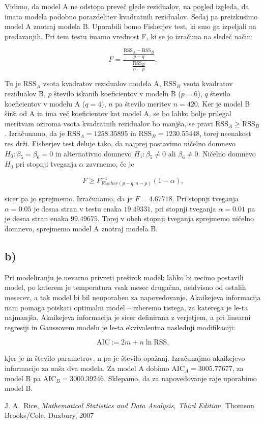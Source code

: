 \documentclass[12pt, a4paper]{article}
\begin{document}
Vidimo, da model A ne odstopa preveč glede rezidualov, na pogled izgleda, da imata 
modela podobno porazdelitev kvadratnih rezidualov. 
Sedaj pa preizkusimo model A znotraj modela B. Uporabili bomo Fisherjev test, ki 
smo ga izpeljali na predavanjih. Pri tem testu imamo vrednost F, ki se jo izračuna 
na sledeč način: 

$$  F = \frac{\frac{\text{RSS}_A - \text{RSS}_B}{p-q}}{\frac{\text{RSS}_B}{n-p}} \text{.}
$$

Tu je $\text{RSS}_A$ vsota kvadratov rezidualov modela A, $\text{RSS}_B$ vsota 
kvadratov rezidualov B, $p$ število iskanih koeficientov v modelu B ($p=6$), 
$q$ število koeficientov v modelu A ($q=4$), $n$ pa število meritev $n=420$. 
Ker je model B širši od A in ima več koeficientov kot model A, se bo lahko bolje 
prilegal meritvam oziroma vsota kvadratnih rezidualov bo manjša, se pravi 
$\text{RSS}_A \geq \text{RSS}_B$. Izračunamo, da je $\text{RSS}_A = 1258.35895$ 
in $\text{RSS}_B = 1230.55448$, torej neenakost res drži. 
Fisherjev test deluje tako, da najprej postavimo ničelno domnevo $H_0 : \beta_5 = 
\beta_6 = 0$ in alternativno domnevo $H_1 : \beta_5 \neq 0 \text{ ali }\beta_6 
\neq 0$. Ničelno domnevo $H_0$ pri stopnji tveganja $\alpha$ zavrnemo, če je

$$ F \geq F^{-1}_{Fischer(p-q, n-p)}(1-\alpha) \text{,}
$$

sicer pa jo sprejmemo. Izračunamo, da je $F = 4.67718$. Pri stopnji tveganja 
$\alpha = 0.05$ je desna stran v testu enaka $19.49331$, pri stopnji tveganja 
$\alpha = 0.01$ pa je desna stran enaka $99.49675$. Torej v obeh stopnji tveganja 
sprejmemo ničelno domnevo, sprejmemo model A znotraj modela B.

\subsection*{b)}
Pri modeliranju je nevarno privzeti preširok model: lahko bi recimo postavili
model, po katerem je temperatura vsak mesec drugačna, neidvisno od ostalih
mesecev, a tak model bi bil neuporaben za napovedovanje. Akaikejeva 
informacija nam pomaga poiskati optimalni model – izberemo tistega, za katerega
je le-ta najmanjša. Akaikejeva informacija je sicer definirana z verjetjem, 
a pri linearni regresiji in Gaussovem modelu je le-ta ekvivalentna naslednji 
modifikaciji:  

\[
    \text{AIC} := 2m + n \ln \text{RSS,}
    \]

kjer je m število parametrov, n pa je število opažanj. Izračunajmo akaikejevo 
informacijo za naša dva modela. Za model A dobimo AIC$_A = 3005.77677$, za 
model B pa AIC$_B = 3000.39246$. Sklepamo, da za napovedovanje raje uporabimo 
model B.






\begin{thebibliography}{99}
     J. A.~Rice, \emph{Mathematical Statistics and Data Analysis, Third Edition}, Thomson Brooks/Cole, Duxbury, 2007
\end{thebibliography}
\end{document}
